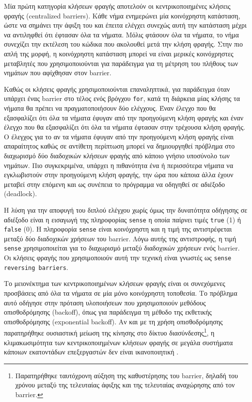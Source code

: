 Μία πρώτη κατηγορία κλήσεων φραγής αποτελούν οι κεντρικοποιημένες κλήσεις φραγής (centralized barriers). Κάθε νήμα ενημερώνει μία κοινόχρηστη κατάσταση, ώστε να σημάνει την άφιξη του και έπειτα ελέγχει συνεχώς αυτή την κατάσταση μέχρι να αντιληφθεί ότι έφτασαν όλα τα νήματα. Μόλις φτάσουν όλα τα νήματα, το νήμα συνεχίζει την εκτέλεση του κώδικα που ακολουθεί μετά την κλήση φραγής. Στην πιο απλή της μορφή, η κοινόχρηστη κατάσταση μπορεί να είναι μερικές κοινόχρηστες μεταβλητές που χρησιμοποιούνται για παράδειγμα για τη μέτρηση του πλήθους των νημάτων που αφίχθησαν στον barrier.

Καθώς οι κλήσεις φραγής χρησιμοποιούνται επαναληπτικά, για παράδειγμα όταν υπάρχει ένας barrier στο τέλος ενός βρόγχου \texttt{for}, κατά τη διάρκεια μίας κλήσης τα νήματα θα πρέπει να πραγματοποιήσουν δύο ελέγχους. Έναν έλεγχο που θα εξασφαλίζει ότι όλα τα νήματα έφυγαν από την προηγούμενη κλήση φραγής και έναν έλεγχο που θα εξασφαλίζει ότι όλα τα νήματα έφτασαν στην τρέχουσα κλήση φραγής. Ο έλεγχος για το αν τα νήματα έφυγαν από την προηγούμενη κλήση φραγής είναι απαραίτητος καθώς σε αντίθετη περίπτωση μπορεί να δημιουργηθεί πρόβλημα στο διαχωρισμό δύο διαδοχικών κλήσεων φραγής από κάποιο γνήσιο υποσύνολο των νημάτων. Πιο συγκεκριμένα, υπάρχει η πιθανότητα ένα ή περισσότερα νήματα να εγκλωβιστούν στην προηγούμενη κλήση φραγής, την ώρα που κάποια άλλα έχουν μεταβεί στην επόμενη και ως συνέπεια το πρόγραμμα να οδηγηθεί σε αδιέξοδο (deadlock).

Η λύση για την αποφυγή του διπλού ελέγχου χωρίς όμως την δυνατότητα οδήγησης σε αδιέξοδο είναι η εισαγωγή της πληροφορίας \texttt{sense} η οποία παίρνει τιμές \texttt{true} (1) ή \texttt{false} (0). Η πληροφορία \texttt{sense} είναι κοινόχρηστη και η τιμή της αντιστρέφεται μεταξύ δύο διαδοχικών χρήσεων του barrier. Λόγω αυτής της αντιστροφής, η τιμή \texttt{sense} χρησιμοποιείται για το διαχωρισμό μεταξύ διαδοχικών χρήσεων ενός barrier. Οι κλήσεις φραγής που χρησιμοποιούν αυτή την τεχνική είναι γνωστές ως \texttt{sense reversing barriers}.

Το μειονέκτημα των κεντρικοποιημένων κλήσεων φραγής είναι οι συνεχόμενες προσβάσεις από όλα τα νήματα σε μία μόνο κοινόχρηστη τοποθεσία. Το πρόβλημα αυτό οδήγησε στην πρόταση υλοποιήσεων που χρησιμοποιούν μεθόδους οπισθοδρόμησης (backoff), όπως για παράδειγμα τη μέθοδο της εκθετικής οπισθοδρόμησης (exponential backoff).  Αν και με τη χρήση οπισθοδρόμησης παρατηρήθηκε ουσιαστική μείωση της κίνησης στο δίκτυο διασύνδεσης\footnote{Παρατηρήθηκε ταυτόχρονη αύξηση της καθυστέρησης του barrier, δηλαδή του χρόνου μεταξύ της τελευταίας άφιξης και της τελευταίας αναχώρησης από τον barrier.}, η κλιμακωσιμότητα των κεντρικοποιημένων κλήσεων φραγής σε μεγάλα συστήματα κάποιων εκατοντάδων επεξεργαστών δεν είναι ικανοποιητική \cite{mellor1991algorithms}.

